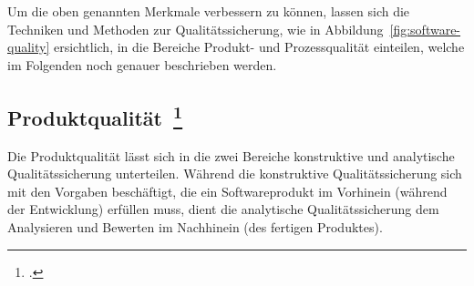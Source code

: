 Um die oben genannten Merkmale verbessern zu können, lassen sich die Techniken und Methoden zur Qualitätssicherung, wie in Abbildung~\ref{fig:software-quality} ersichtlich, in die Bereiche Produkt- und Prozessqualität einteilen, welche im Folgenden noch genauer beschrieben werden.

\subsection[Produktqualität]{Produktqualität~\footcite[vgl.][Kapitel 1.4.1]{hoffmann_software_qualitat_2013}}

Die Produktqualität lässt sich in die zwei Bereiche konstruktive und analytische Qualitätssicherung unterteilen.
Während die konstruktive Qualitätssicherung sich mit den Vorgaben beschäftigt, die ein Softwareprodukt im Vorhinein (während der Entwicklung) erfüllen muss, dient die analytische Qualitätssicherung dem Analysieren und Bewerten im Nachhinein (des fertigen Produktes).

